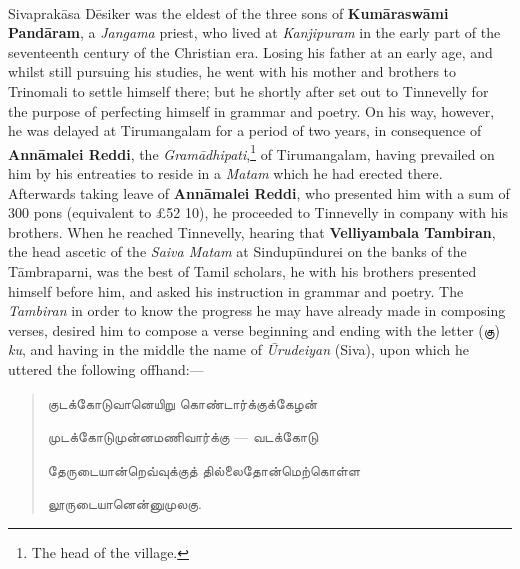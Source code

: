 \documentclass{article}
\newcommand{\TamilText}[1]{\texttamil{#1}}
\newcommand{\tam}[1]{\TamilText{#1}}
\begin{document}
\paragraph{}
Sivaprak\={a}sa D\={e}siker was the eldest of the three sons of \textbf{Kum\={a}rasw\={a}mi Pand\={a}ram}, a \emph{Jangama} priest, who lived at \emph{Kanjipuram} in the early part of the seventeenth century of the Christian era. Losing his father at an early age, and whilst still pursuing his studies, he went with his mother and brothers to Trinomali to settle himself there; but he shortly after set out to Tinnevelly for the purpose of perfecting himself in grammar and poetry. On his way, however, he was delayed at Tirumangalam for a period of two years, in consequence of \textbf{Ann\={a}malei Reddi}, the \emph{Gram\={a}dhipati},\footnote{The head of the village.} of Tirumangalam, having prevailed on him by his entreaties to reside in a \emph{Matam} which he had erected there. Afterwards taking leave of \textbf{Ann\={a}malei Reddi}, who presented him with a sum of 300 pons (equivalent to £52 10), he proceeded to Tinnevelly in company with his brothers. When he reached Tinnevelly, hearing that \textbf{Velliyambala Tambiran}, the head ascetic of the \emph{Saiva Matam} at Sindup\={u}ndurei on the banks of the T\={a}mbraparni, was the best of Tamil scholars, he with his brothers presented himself before him, and asked his instruction in grammar and poetry. The \emph{Tambiran} in order to know the progress he may have already made in composing verses, desired him to compose a verse beginning and ending with the letter (\tam{கு}) \emph{ku}, and having in the middle the name of \emph{\={U}rudeiyan} (Siva), upon which he uttered the following offhand:---
\begin{quotation}\small
\tam{குடக்கோடுவானெயிறு கொண்டார்க்குக்கேழன்‌}

\tam{முடக்கோடுமுன்னமணிவார்க்கு} --- \tam{வடக்கோடு}

\tam{தேருடையான்றெவ்வுக்குத்‌ தில்லைதோன்மெற்கொள்ள}

\tam{லூருடையானென்னுமுலகு}.
\end{quotation}
\end{document}
